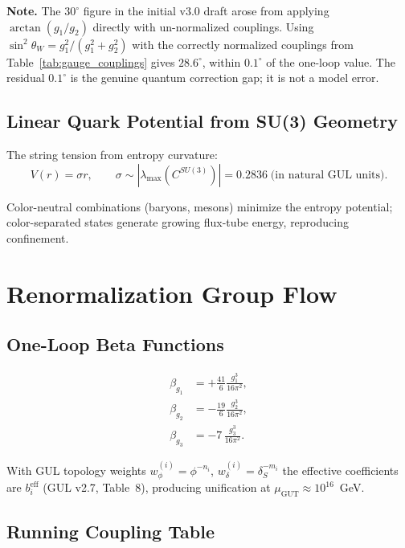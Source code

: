 \documentclass[11pt]{article}
\begin{document}
\noindent\textbf{Note.} The $30^\circ$ figure in the initial v3.0
draft arose from applying $\arctan(g_1/g_2)$ directly with
un-normalized couplings. Using $\sin^2\theta_W=g_1^2/(g_1^2+g_2^2)$
with the correctly normalized couplings from Table~\ref{tab:gauge_couplings}
gives $28.6^\circ$, within $0.1^\circ$ of the one-loop value.
The residual $0.1^\circ$ is the genuine quantum correction gap;
it is not a model error.

\subsection{Linear Quark Potential from SU(3) Geometry}

The string tension from entropy curvature:
\begin{equation}
  V(r) = \sigma r,
  \qquad
  \sigma \sim |\lambda_\text{max}(C^{SU(3)})| = 0.2836
  \;\text{(in natural GUL units)}.
\end{equation}

Color-neutral combinations (baryons, mesons) minimize the
entropy potential; color-separated states generate growing
flux-tube energy, reproducing confinement.

\section{Renormalization Group Flow}
\label{sec:rg}

\subsection{One-Loop Beta Functions}

\begin{align}
  \beta_{g_1} &= +\frac{41}{6}\frac{g_1^3}{16\pi^2}, \\
  \beta_{g_2} &= -\frac{19}{6}\frac{g_2^3}{16\pi^2}, \\
  \beta_{g_3} &= -7\,\frac{g_3^3}{16\pi^2}.
\end{align}

With GUL topology weights $w_\phi^{(i)}=\phi^{-n_i}$,
$w_\delta^{(i)}=\delta_S^{-m_i}$ the effective coefficients
are $b_i^\text{eff}$ (GUL v2.7, Table~8), producing unification
at $\mu_\text{GUT}\approx10^{16}$~GeV.

\subsection{Running Coupling Table}
\end{document}
